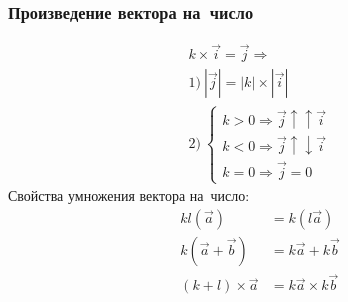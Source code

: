 \documentclass[]{scrartcl}
\begin{document}
\subsubsection{Произведение вектора на~число}
\begin{equation}\label{eq:vec-mult-number}
\begin{aligned}
k\times \vec{i}=\vec{j} \Rightarrow\\
1)\ |\vec{j}|=|k|\times|\vec{i}|\\
2)\ 
\begin{cases}
k>0 \Rightarrow \vec{j}\uparrow \uparrow \vec{i}\\
k<0 \Rightarrow \vec{j}\uparrow \downarrow \vec{i}\\
k=0 \Rightarrow \vec{j}=0
\end{cases}
\end{aligned}
\end{equation}
Свойства умножения вектора на~число:
\begin{equation}\label{eq:vec-mult-number-prop}
\begin{aligned}
kl(\vec{a})&=k(l\vec{a})\\
k(\vec{a}+\vec{b})&=k\vec{a}+k\vec{b}\\
(k+l)\times \vec{a}&=k\vec{a}\times k\vec{b}
\end{aligned}
\end{equation}
\end{document}
